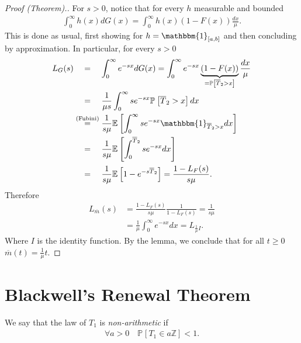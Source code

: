 \begin{proof}[Proof (Theorem).]
For $s> 0$, notice that for every $h$ measurable and bounded
\begin{align}
	\int_{0}^{\infty} h(x)dG(x) = \int_{0}^{\infty} h(x)(1-F(x)) \frac{dx}{\mu }. 
\end{align}
This is done as usual, first showing for $h=\mathbbm{1}_{[a,b]} $ and then concluding by approximation.
In particular, for every $s> 0$ 
\begin{align}
	L_G(s) &\stackrel{\phantom{\textrm{(Fubini)}}}{=}  \int_{0}^{\infty} e^{-sx}dG(x) = \int_{0}^{\infty} e^{-sx}\underbrace{(1-F(x))}_{=\mathbb{P}_{} \left[ \overline{T}_2>x \right] } \frac{dx}{\mu } \\
	       &\stackrel{\phantom{\textrm{(Fubini)}}}{=}  \frac{1}{\mu s} \int_{0}^{\infty} s e^{-sx} \mathbb{P}_{} \left[ \overline{T}_2>x \right] dx \\
	       &\stackrel{\textrm{(Fubini)}}{=} \frac{1}{s \mu } \mathbb{E}_{} \left[ \int_{0}^{\infty} s e^{-sx}\mathbbm{1}_{\overline{T}_2>x} dx \right]  \\
	       &\stackrel{\phantom{\textrm{(Fubini)}}}{=}  \frac{1}{s \mu } \mathbb{E}_{ } \left[ \int_{0}^{\overline{T}_2} s e^{-sx}dx \right] \\
	       & \stackrel{\phantom{\textrm{(Fubini)}}}{=} \frac{1}{s \mu } \mathbb{E}_{} \left[ 1 - e^{-s \overline{T}_2} \right]  = \frac{1-L_F(s)}{s\mu }.
\end{align}
Therefore
\begin{align}
	L_{\overline{m}}(s) &= \frac{1-L_F(s)}{s\mu }\frac{1}{1-L_F(s)} =  \frac{1}{s\mu } \\
			    &= \frac{1}{\mu } \int_{0}^{\infty} e^{-sx}dx = L_{\frac{1}{\mu }I}.
\end{align}
Where $I$ is the identity function. By the lemma, we conclude that for all $t\geq 0$ $\overline{m}(t) = \frac{1}{\mu }t$.
\end{proof}


\section{Blackwell's Renewal Theorem}
\begin{defn}
	We say that the law of $T_1$ is \emph{non-arithmetic} if
	\begin{align}
		\forall a> 0 \quad \mathbb{P}_{} \left[ T_1 \in a \mathbb{Z} \right] < 1.
	\end{align}
	
\end{defn}

